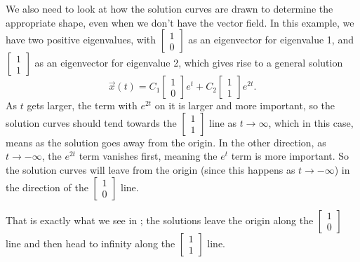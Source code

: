 We also need to look at how the solution curves are drawn to determine the appropriate shape, even when we don't have the vector field. In this example, we have two positive eigenvalues, with $\left[\begin{smallmatrix} 1 \\ 0 \end{smallmatrix}\right]$ as an eigenvector for eigenvalue 1, and $\left[\begin{smallmatrix} 1 \\ 1 \end{smallmatrix}\right]$ as an eigenvector for eigenvalue 2, which gives rise to a general solution 
\[ \vec{x}(t) = C_1 \begin{bmatrix} 1\\ 0 \end{bmatrix}e^t + C_2 \begin{bmatrix}  1 \\ 1 \end{bmatrix}e^{2t}.\]
As $t$ gets larger, the term with $e^{2t}$ on it is larger and more important, so the solution curves should tend towards the $\left[\begin{smallmatrix} 1 \\ 1 \end{smallmatrix}\right]$ line as $t\rightarrow \infty$, which in this case, means as the solution goes away from the origin. In the other direction, as $t \rightarrow -\infty$, the $e^{2t}$ term vanishes first, meaning the $e^t$ term is more important. So the solution curves will leave from the origin (since this happens as $t \rightarrow -\infty$) in the direction of the $\left[\begin{smallmatrix} 1 \\ 0 \end{smallmatrix}\right]$ line. 

That is exactly what we see in ; the solutions leave the origin along the $\left[\begin{smallmatrix} 1 \\ 0 \end{smallmatrix}\right]$ line and then head to infinity along the $\left[\begin{smallmatrix} 1 \\ 1 \end{smallmatrix}\right]$ line. 

\medskip

